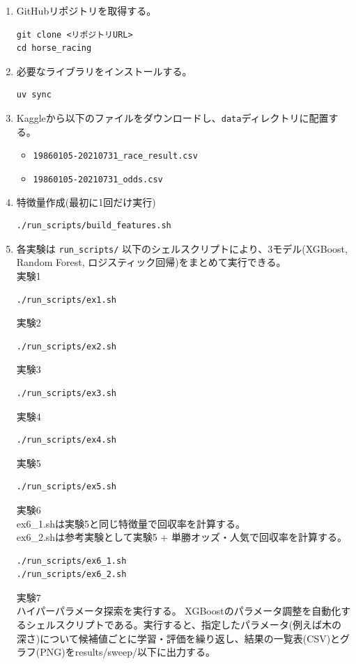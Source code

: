 \documentclass[dvipdfmx, a4paper, 11pt, titlepage]{jsarticle}
\begin{document}
\begin{enumerate}
    \item GitHubリポジトリを取得する。

\begin{verbatim}
git clone <リポジトリURL>
cd horse_racing
\end{verbatim}

    \item 必要なライブラリをインストールする。

\begin{verbatim}
uv sync
\end{verbatim}

    \item Kaggleから以下のファイルをダウンロードし、\texttt{data}ディレクトリに配置する。

    \begin{itemize}
        \item \texttt{19860105-20210731\_race\_result.csv}
        \item \texttt{19860105-20210731\_odds.csv}
    \end{itemize}

    \item 特徴量作成(最初に1回だけ実行)
\begin{verbatim}
./run_scripts/build_features.sh
\end{verbatim}

    \item 各実験は \texttt{run\_scripts/} 以下のシェルスクリプトにより、3モデル(XGBoost, Random Forest, ロジスティック回帰)をまとめて実行できる。\\
実験1
\begin{verbatim}
./run_scripts/ex1.sh
\end{verbatim}
実験2
\begin{verbatim}
./run_scripts/ex2.sh
\end{verbatim}
実験3
\begin{verbatim}
./run_scripts/ex3.sh
\end{verbatim}
実験4
\begin{verbatim}
./run_scripts/ex4.sh
\end{verbatim}
実験5
\begin{verbatim}
./run_scripts/ex5.sh
\end{verbatim}
実験6\\
ex6\_1.shは実験5と同じ特徴量で回収率を計算する。\\
ex6\_2.shは参考実験として実験5 + 単勝オッズ・人気で回収率を計算する。
\begin{verbatim}
./run_scripts/ex6_1.sh
./run_scripts/ex6_2.sh
\end{verbatim}
実験7\\
ハイパーパラメータ探索を実行する。
XGBoostのパラメータ調整を自動化するシェルスクリプトである。実行すると、指定したパラメータ(例えば木の深さ)について候補値ごとに学習・評価を繰り返し、結果の一覧表(CSV)とグラフ(PNG)をresults/sweep/以下に出力する。


\end{enumerate}
\end{document}
